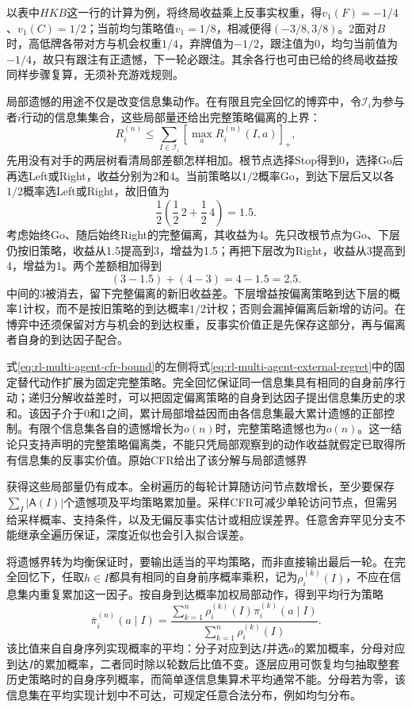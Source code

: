 以表中$HKB$这一行的计算为例，将终局收益乘上反事实权重，得$v_1(F)=-1/4$、$v_1(C)=1/2$；当前均匀策略值$v_1=1/8$，相减便得$(-3/8,3/8)$。2面对$B$时，高低牌各带对方与机会权重$1/4$，弃牌值为$-1/2$，跟注值为0，均匀当前值为$-1/4$，故只有跟注有正遗憾，下一轮必跟注。其余各行也可由已给的终局收益按同样步骤复算，无须补充游戏规则。

局部遗憾的用途不仅是改变信息集动作。在有限且完全回忆的博弈中，令$\mathcal I_i$为参与者$i$行动的信息集集合，这些局部量还给出完整策略偏离的上界：
\begin{equation}
 R_i^{(n)}
 \leq\sum_{I\in\mathcal I_i}
        \left[\max_a R_i^{(n)}(I,a)\right]_+,
 \label{eq:rl-multi-agent-cfr-bound}
\end{equation}
先用没有对手的两层树看清局部差额怎样相加。根节点选择Stop得到0，选择Go后再选Left或Right，收益分别为2和4。当前策略以$1/2$概率Go，到达下层后又以各$1/2$概率选Left或Right，故旧值为
\[
  \frac12\left(\frac12\,2+\frac12\,4\right)=1.5.
\]
考虑始终Go、随后始终Right的完整偏离，其收益为4。先只改根节点为Go、下层仍按旧策略，收益从1.5提高到3，增益为1.5；再把下层改为Right，收益从3提高到4，增益为1。两个差额相加得到
\[
  (3-1.5)+(4-3)=4-1.5=2.5.
\]
中间的3被消去，留下完整偏离的新旧收益差。下层增益按偏离策略到达下层的概率1计权，而不是按旧策略的到达概率$1/2$计权；否则会漏掉偏离后新增的访问。在博弈中还须保留对方与机会的到达权重，反事实价值正是先保存这部分，再与偏离者自身的到达因子配合。

式\eqref{eq:rl-multi-agent-cfr-bound}的左侧将式\eqref{eq:rl-multi-agent-external-regret}中的固定替代动作扩展为固定完整策略。完全回忆保证同一信息集具有相同的自身前序行动；递归分解收益差时，可以把固定偏离策略的自身到达因子提出信息集历史的求和。该因子介于0和1之间，累计局部增益因而由各信息集最大累计遗憾的正部控制。有限个信息集各自的遗憾增长为$o(n)$时，完整策略遗憾也为$o(n)$。这一结论只支持声明的完整策略偏离类，不能只凭局部观察到的动作收益就假定已取得所有信息集的反事实价值。原始CFR给出了该分解与局部遗憾界

获得这些局部量仍有成本。全树遍历的每轮计算随访问节点数增长，至少要保存$\sum_I|\mathsf A(I)|$个遗憾项及平均策略累加量。采样CFR可减少单轮访问节点，但需另给采样概率、支持条件，以及无偏反事实估计或相应误差界。任意舍弃罕见分支不能继承全遍历保证，深度近似也会引入拟合误差。

将遗憾界转为均衡保证时，要输出适当的平均策略，而非直接输出最后一轮。在完全回忆下，任取$h\in I$都具有相同的自身前序概率乘积，记为$\rho_i^{(k)}(I)$，不应在信息集内重复累加这一因子。按自身到达概率加权局部动作，得到平均行为策略
\begin{equation}
 \bar\pi_i^{(n)}(a\mid I)=
 \frac{\sum_{k=1}^{n}\rho_i^{(k)}(I)\pi_i^{(k)}(a\mid I)}
      {\sum_{k=1}^{n}\rho_i^{(k)}(I)}.
 \label{eq:rl-multi-agent-average-behavior}
\end{equation}
该比值来自自身序列实现概率的平均：分子对应到达$I$并选$a$的累加概率，分母对应到达$I$的累加概率，二者同时除以轮数后比值不变。逐层应用可恢复均匀抽取整套历史策略时的自身序列概率，而简单逐信息集算术平均通常不能。分母若为零，该信息集在平均实现计划中不可达，可规定任意合法分布，例如均匀分布。

